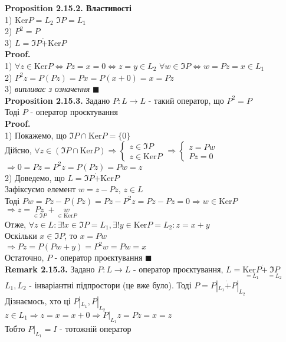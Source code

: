 \documentclass[a4paper, 14pt]{extarticle}
\def\rm#1{\textbf{Remark {#1}}}
\def\prp#1{\textbf{Proposition {#1}}}
\def\proof{\textbf{Proof.}\\}
\def\bigline{\vspace{5mm}\\}
\def\qed{$\blacksquare$}
\def\ker#1{\textrm{Ker} {#1}}
\begin{document}
\prp{2.15.2. Властивості}\\
1) $\ker P = L_2$ \hspace{1cm} $\Im P = L_1$\\
2) $P^2 = P$\\
3) $L = \Im P \dot{+} \ker P$\\
\proof
1) $\forall z \in \ker P \iff Pz = x = 0 \iff z = y \in L_2$
$\forall w \in \Im P \iff w = Pz = x \in L_1$
\bigline
2) $P^2z = P(Pz) = Px = P(x+0)=x=Pz$
\bigline
3) \textit{випливає з означення} \qed
\bigline
\prp{2.15.3.} Задано $P: L \to L$ - такий оператор, що $P^2 = P$\\
Тоді $P$ - оператор проєктування\\
\proof
1) Покажемо, що $\Im P \cap \ker P = \{0\}$\\
Дійсно, $\forall z \in (\Im P \cap \ker P) \Rightarrow \begin{cases} z \in \Im P \\ z \in \ker P \end{cases} \Rightarrow \begin{cases} z = Pw \\ Pz = 0 \end{cases}$\\
$\Rightarrow 0 = Pz = P^2z = P(Pz) = Pw = z$
\bigline
2) Доведемо, що $L = \Im P \dot{+} \ker P$\\
Зафіксуємо елемент $w = z - Pz$, $z \in L$\\
Тоді $Pw = Pz - P(Pz) = Pz - P^2z = Pz - Pz = 0 \Rightarrow w \in \ker P$\\
$\Rightarrow z = \underset{\in \Im P}{Pz} + \underset{\in \ker P}{w}$\\
Отже, $\forall z \in L: \exists! x \in \Im P = L_1, \exists! y \in \ker P = L_2: z = x+y$\\
Оскільки $x \in \Im P$, то $x = Pw$\\
$\Rightarrow Pz = P(Pw+y) = P^2 w = Pw = x$\\
Остаточно, $P$ - оператор проєктування \qed
\bigline
\rm{2.15.3.} Задано $P: L \to L$ - оператор проєктування, $L = \underset{=L_1}{\ker P} \dot{+} \underset{=L_2}{\Im P}$\\
$L_1,L_2$ - інваріантні підпростори (це вже було). Тоді $P = P|_{L_1} \dot{+} P|_{L_2}$\\
Дізнаємось, хто ці $P|_{L_1}, P|_{L_2}$\\
$z \in L_1 \Rightarrow z = x = x+0 \Rightarrow P|_{L_1}z = Pz = x = z$\\
Тобто $P|_{L_1} = I$ - тотожній оператор\\
\end{document}
